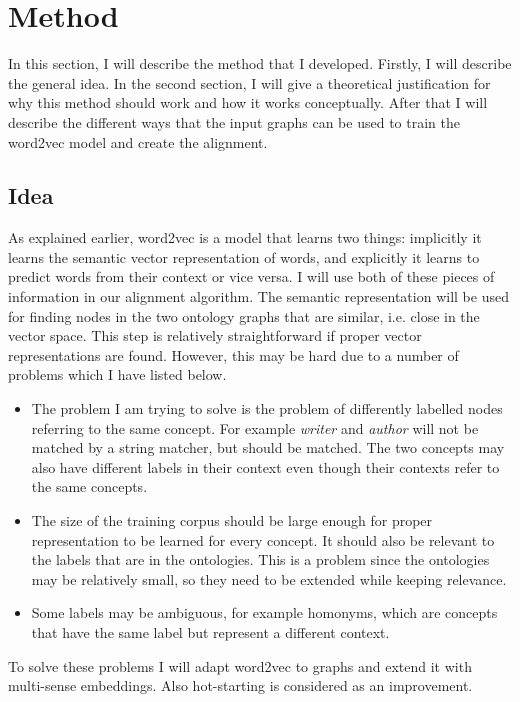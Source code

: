 \documentclass{article}
\begin{document}
 \section{Method}
 In this section, I will describe the method that I developed. Firstly, I will describe the general idea. In the second section, I will give a theoretical justification for why this method should work and how it works conceptually. After that I will describe the different ways that the input graphs can be used to train the word2vec model and create the alignment. 
 \subsection{Idea}
 As explained earlier, word2vec is a model that learns two things: implicitly it learns the semantic vector representation of words, and explicitly it learns to predict words from their context or vice versa. I will use both of these pieces of information in our alignment algorithm.
 The semantic representation will be used for finding nodes in the two ontology graphs that are similar, i.e. close in the vector space. This step is relatively straightforward if proper vector representations are found. However, this may be hard due to a number of problems which I have listed below.

 \begin{itemize}
  \item The problem I am trying to solve is the problem of differently labelled nodes referring to the same concept. For example \emph{writer} and \emph{author} will not be matched by a string matcher, but should be matched. The two concepts may also have different labels in their context even though their contexts refer to the same concepts.
  \item The size of the training corpus should be large enough for proper representation to be learned for every concept. It should also be relevant to the labels that are in the ontologies. This is a problem since the ontologies may be relatively small, so they need to be extended while keeping relevance.
  \item Some labels may be ambiguous, for example homonyms, which are concepts that have the same label but represent a different context.
 \end{itemize}
 
 To solve these problems I will adapt word2vec to graphs and extend it with multi-sense embeddings. Also hot-starting is considered as an improvement.
 
\end{document}
